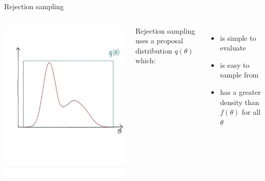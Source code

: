 \documentclass[compress]{beamer}
\begin{document}
\begin{frame}[label=sec-5-3]{Rejection sampling}
\begin{columns}[c] 
\includegraphics[width=1\linewidth]{RS2}

Rejection sampling uses a \alert{proposal distribution $q(\theta)$} which:
\begin{itemize}
\item is simple to evaluate
\item is easy to sample from
\item has a greater density than $f(\theta)$ for all $\theta$
\end{itemize}
\end{columns}
\end{frame}
\end{document}
